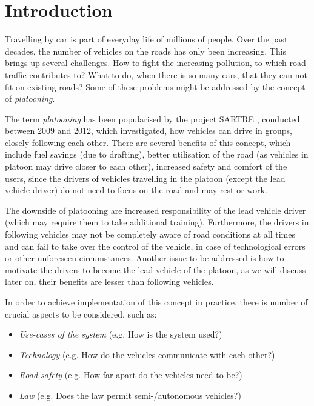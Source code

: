 \section{Introduction}
% 
Travelling by car is part of everyday life of millions of people. Over the past decades, the number of vehicles on the roads has only been increasing\footnotemark. This brings up several challenges. How to fight the increasing pollution, to which road traffic contributes to? What to do, when there is so many cars, that they can not fit on existing roads? Some of these problems might be addressed by the concept of \emph{platooning}.\par
% 
% 
The term \emph{platooning} has been popularised by the project SARTRE \cite{Chan2012ProjectSARTRE}, conducted between 2009 and 2012, which investigated, how vehicles can drive in groups, closely following each other. There are several benefits of this concept, which include fuel savings (due to drafting\footnotemark[1]), better utilisation of the road (as vehicles in platoon may drive closer to each other), increased safety and comfort of the users, since the drivers of vehicles travelling in the platoon (except the lead vehicle driver) do not need to focus on the road and may rest or work.\par
% 
The downside of platooning are increased responsibility of the lead vehicle driver (which may require them to take additional training). Furthermore, the drivers in following vehicles may not be completely aware of road conditions at all times and can fail to take over the control of the vehicle, in case of technological errors or other unforeseen circumstances. Another issue to be addressed is how to motivate the drivers to become the lead vehicle of the platoon, as we will discuss later on, their benefits are lesser than following vehicles.\par
% 
In order to achieve implementation of this concept in practice, there is number of crucial aspects to be considered, such as:
\begin{itemize}[noitemsep]
    \item \emph{Use-cases of the system} (e.g. How is the system used?)
    \item \emph{Technology} (e.g. How do the vehicles communicate with each other?)
    \item \emph{Road safety} (e.g. How far apart do the vehicles need to be?)
    \item \emph{Law} (e.g. Does the law permit semi-/autonomous vehicles?)
\end{itemize} \par
